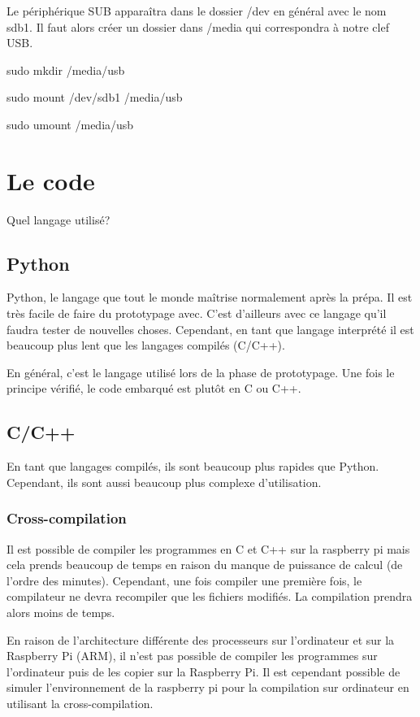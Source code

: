 \documentclass[a4paper, 11pt]{report}
\begin{document}
Le périphérique SUB apparaîtra dans le dossier /dev en général avec le nom sdb1. Il faut alors créer un dossier dans /media qui correspondra à notre clef USB.

sudo  mkdir /media/usb 

sudo mount /dev/sdb1 /media/usb

sudo umount /media/usb

\chapter{Le code}

Quel langage utilisé?

\section{Python}
Python, le langage que tout le monde maîtrise normalement après la prépa. Il est très facile de faire du prototypage avec. C'est d'ailleurs avec ce langage qu'il faudra tester de nouvelles choses. Cependant, en tant que langage interprété il est beaucoup plus lent que les langages compilés (C/C++).

En général, c'est le langage utilisé lors de la phase de prototypage. Une fois le principe vérifié, le code embarqué est plutôt en C ou C++.

\section{C/C++}
En tant que langages compilés, ils sont beaucoup plus rapides que Python. Cependant, ils sont aussi beaucoup plus complexe d'utilisation.

\subsection{Cross-compilation}
Il est possible de compiler les programmes en C et C++ sur la raspberry pi mais cela prends beaucoup de temps en raison du manque de puissance de calcul (de l'ordre des minutes). Cependant, une fois compiler une première fois, le compilateur ne devra recompiler que les fichiers modifiés. La compilation prendra alors moins de temps. 

En raison de l'architecture différente des processeurs sur l'ordinateur et sur la Raspberry Pi (ARM), il n'est pas possible de compiler les programmes sur l'ordinateur puis de les copier sur la Raspberry Pi. Il est cependant possible de simuler l'environnement de la raspberry pi pour la compilation sur ordinateur en utilisant la cross-compilation.
\end{document}
